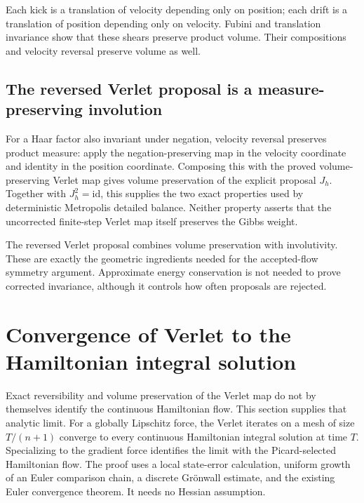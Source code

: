 \documentclass[11pt,a4paper]{report}
\begin{document}
Each kick is a translation of velocity depending only on position; each drift is a translation of position depending only on velocity. Fubini and translation invariance show that these shears preserve product volume. Their compositions and velocity reversal preserve volume as well.

\subsection{\texorpdfstring{The reversed Verlet proposal is a measure-preserving involution}{The reversed Verlet proposal is a measure-preserving involution}}
\label{report-step-KineticLangevin-Hamiltonian-lean-7}


For a Haar factor also invariant under negation, velocity reversal preserves product measure: apply the negation-preserving map in the velocity coordinate and identity in the position coordinate. Composing this with the proved volume-preserving Verlet map gives volume preservation of the explicit proposal \(J_h\). Together with \(J_h^2=\mathrm{id}\), this supplies the two exact properties used by deterministic Metropolis detailed balance. Neither property asserts that the uncorrected finite-step Verlet map itself preserves the Gibbs weight.



The reversed Verlet proposal combines volume preservation with involutivity. These are exactly the geometric ingredients needed for the accepted-flow symmetry argument. Approximate energy conservation is not needed to prove corrected invariance, although it controls how often proposals are rejected.

\section{\texorpdfstring{Convergence of Verlet to the Hamiltonian integral solution}{Convergence of Verlet to the Hamiltonian integral solution}}
\label{proof-module-KineticLangevin-HamiltonianConvergence-lean}


Exact reversibility and volume preservation of the Verlet map do not by themselves identify the continuous Hamiltonian flow. This section supplies that analytic limit. For a globally Lipschitz force, the Verlet iterates on a mesh of size \(T/(n+1)\) converge to every continuous Hamiltonian integral solution at time \(T\). Specializing to the gradient force identifies the limit with the Picard-selected Hamiltonian flow. The proof uses a local state-error calculation, uniform growth of an Euler comparison chain, a discrete Grönwall estimate, and the existing Euler convergence theorem. It needs no Hessian assumption.
\end{document}
